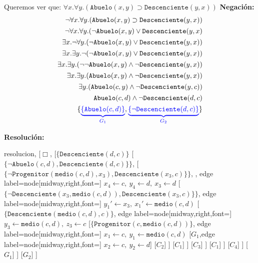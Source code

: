 \documentclass[10pt,a4paper]{article}
\begin{document}
Queremos ver que: $\forall x. \forall y. (\texttt{Abuelo}(x,y) \supset \texttt{Descenciente}(y,x))$ 
\textbf{Negación:}
\begin{align*}
\lnot\forall x. \forall y. (\texttt{Abuelo}(x,y) \supset \texttt{Descenciente}(y,x)) \\[1pt]
\lnot\forall x. \forall y. (\lnot \texttt{Abuelo}(x,y) \lor \texttt{Descenciente}(y,x) \\[1pt]
\exists x. \lnot \forall y. (\lnot \texttt{Abuelo}(x,y) \lor \texttt{Descenciente}(y,x)) \\[1pt]
\exists x. \exists y. \lnot (\lnot \texttt{Abuelo}(x,y) \lor \texttt{Descenciente}(y,x))\\[1pt]
\exists x. \exists y. (\lnot \lnot \texttt{Abuelo}(x,y) \land \lnot \texttt{Descenciente}(y,x))\\[1pt]
\exists x. \exists y. (\texttt{Abuelo}(x,y) \land \lnot \texttt{Descenciente}(y,x))\\[1pt]
\exists y. (\texttt{Abuelo}(c,y) \land \lnot \texttt{Descenciente}(y,c))\\[1pt]
\texttt{Abuelo}(c,d) \land \lnot \texttt{Descenciente}(d,c)\\[1pt]
\{{\color{blue}\underbrace{\{\texttt{Abuelo}(c,d)\}}_{G_1}},{\color{blue}\underbrace{\{\lnot \texttt{Descenciente}(d,c)\}}_{G_2}}\}\\[1pt]
\end{align*}

\textbf{Resolución:}
\begin{center}
	\begin{forest} resolucion,
[$\Box$,
    [$\{\texttt{Descenciente}(d\comma c)\}$
        [$\{ \lnot \texttt{Abuelo}(c\comma d) \comma \texttt{Descenciente}(d\comma c)\}\}$,
            [ $\{ \lnot \texttt{Progenitor}(\texttt{medio}(c\comma d)\comma x_3)\comma \texttt{Descenciente}(x_3\comma c)\}\}$,
            , edge label={node[midway,right,font=\footnotesize] {$x_4\leftarrow c,~y_4 \leftarrow d,~x_3\leftarrow d$}}
                [$\{ \lnot \texttt{Descenciente}(x_3\comma \texttt{medio}(c\comma d))\comma \texttt{Descenciente}(x_3\comma c)\}\}$,
                 edge label={node[midway,right,font=\footnotesize] {$y_1'\leftarrow x_3,~x_1' \leftarrow \texttt{medio}(c,d)$}}
                    [$\{\texttt{Descenciente}(\texttt{medio}(c\comma d) \comma c)\}$, edge label={node[midway,right,font=\footnotesize] {$y_3\leftarrow \texttt{medio}(c,d),~z_3 \leftarrow c$}}
                        [$\{ \texttt{Progenitor}(c\comma \texttt{medio}(c\comma d))\}$, edge label={node[midway,right,font=\footnotesize] {$x_1\leftarrow c,~y_1\leftarrow \texttt{medio}(c,d)$}}
                            [$G_1$,edge label={node[midway,right,font=\footnotesize] {$x_2\leftarrow c,~y_2\leftarrow d$}}]
                            [$C_2$]
                        ]
                        [$C_1$]
                    ]
                    [$C_3$]
                ]
                [$C_1$]
            ]
            [$C_4$]
        ]
        [$G_1$]
    ]
    [$G_2$]
]
	\end{forest}
\end{center}
\end{document}
